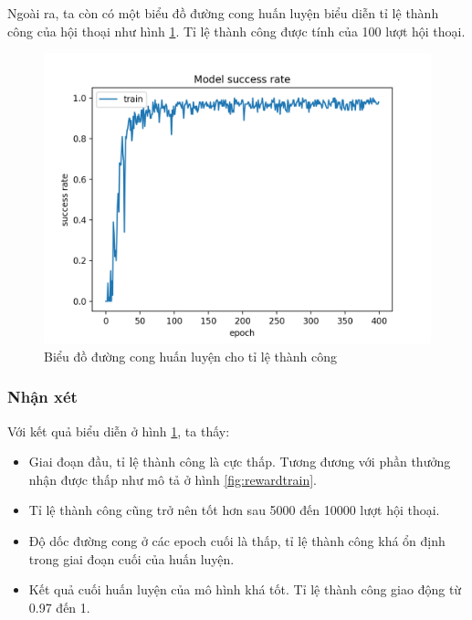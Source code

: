 
Ngoài ra, ta còn có một biểu đồ đường cong huấn luyện biểu diễn tỉ lệ thành công của hội thoại như hình \ref{fig:successtrain}. Tỉ lệ thành công được tính của 100 lượt hội thoại.

\clearpage

\begin{center}
    \begin{figure}[ht!]
        \begin{center}
         \includegraphics[scale=0.95]{chapter7/img/successtrain.png}
        \end{center}
        \caption{Biểu đồ đường cong huấn luyện cho tỉ lệ thành công}
        \label{fig:successtrain}
    \end{figure}
\end{center}

\subsubsection{Nhận xét}
Với kết quả biểu diễn ở hình \ref{fig:successtrain}, ta thấy:

\begin{itemize}
    \item Giai đoạn đầu, tỉ lệ thành công là cực thấp. Tương đương với phần thưởng nhận được thấp như mô tả ở hình \ref{fig:rewardtrain}.
    \item Tỉ lệ thành công cũng trở nên tốt hơn sau 5000 đến 10000 lượt hội thoại.
    \item Độ dốc đường cong ở các epoch cuối là thấp, tỉ lệ thành công khá ổn định trong giai đoạn cuối của huấn luyện.
    \item Kết quả cuối huấn luyện của mô hình khá tốt. Tỉ lệ thành công giao động từ 0.97 đến 1.
\end{itemize}

